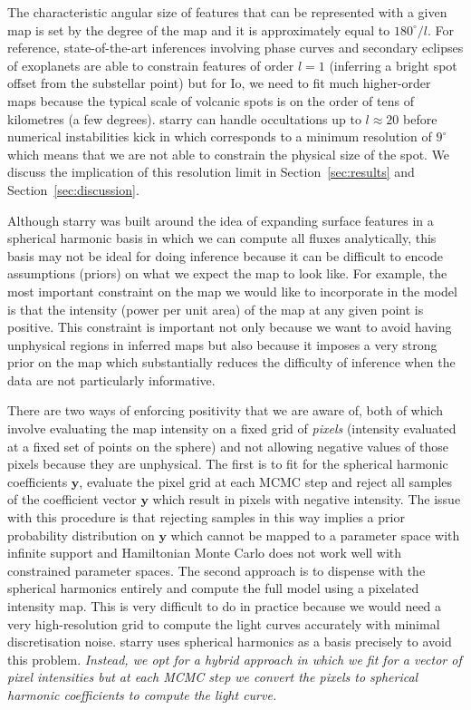 \documentclass[12pt,dvipsnames]{report}
\begin{document}
The characteristic angular size of features that can be represented with a given map 
is set by the degree of the map and it is approximately equal to $180^\circ/l$.
For reference, state-of-the-art inferences involving phase curves and secondary eclipses of exoplanets are able to constrain features of order $l=1$ (inferring a bright spot offset from the substellar point) but for Io, we need to fit much higher-order maps because the typical scale of volcanic spots is on the order of tens of kilometres (a few degrees).
\textsf{starry} can handle occultations up to $l\approx 20$ before numerical 
instabilities kick in \citep{2019AJ....157...64L} which corresponds to a minimum 
resolution of $9^\circ$ which means that we are not able to constrain the physical 
size of the spot.
We discuss the implication of this resolution limit in Section~\ref{sec:results} and Section~\ref{sec:discussion}.

Although \textsf{starry} was built around the idea of expanding surface features in a spherical harmonic basis in which we can compute all fluxes analytically, this basis may not be ideal for doing inference because it can be difficult to encode assumptions (priors) on what we expect the map to look like.
For example, the most important constraint on the map we would like to incorporate in the model is that the intensity (power per unit area) of the map at any given point is positive. 
This constraint is important not only because we want to avoid having unphysical regions in inferred maps but also because it imposes a very strong prior on the map which substantially reduces the difficulty of inference when the data are not particularly informative.

There are two ways of enforcing positivity that we are aware of, both of which involve evaluating the map intensity on a fixed grid of \emph{pixels} (intensity evaluated at a fixed set of points on the sphere) and not allowing negative values of those pixels because they are unphysical.
The first is to fit for the spherical harmonic coefficients $\mathbf{y}$, evaluate the pixel grid at each MCMC step and reject all samples of the coefficient vector $\mathbf{y}$ which result in pixels with negative intensity.
The issue with this procedure is that rejecting samples in this way implies a prior probability distribution on $\mathbf{y}$ which cannot be mapped to a parameter space with infinite support and Hamiltonian Monte Carlo does not work well with constrained parameter spaces.
The second approach is to dispense with the spherical harmonics entirely and compute the full model using a pixelated intensity map.
This is very difficult to do in practice because we would need a very high-resolution grid to compute the light curves accurately with minimal discretisation noise.  
\textsf{starry} uses spherical harmonics as a basis precisely to avoid this problem.
\emph{Instead, we opt for a hybrid approach in which we fit for a vector of pixel intensities but at each MCMC step we convert the pixels to spherical harmonic coefficients to compute the light curve.}
\end{document}
